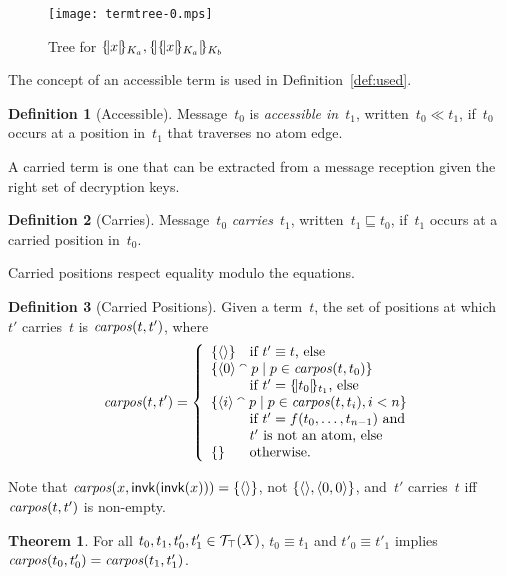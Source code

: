 \documentclass[12pt]{article}
\theoremstyle{definition}
\newtheorem{defn}{Definition}[section]
\newtheorem{thm}{Theorem}[section]
\begin{document}
\begin{figure}
\begin{center}
\texttt{[image: termtree-0.mps]}
\end{center}
\vspace{-2ex}
\caption{Tree for $\{\!|x|\!\}_{K_a},\{\!|\{\!|x|\!\}_{K_a}|\!\}_{K_b}$}\label{fig:term tree}
\end{figure}

The concept of an accessible term is used in Definition~\ref{def:used}.

\begin{defn}[Accessible]\label{def:accessible}
Message~$t_0$ is \emph{accessible in}~$t_1$, written~$t_0\ll t_1$,
if~$t_0$ occurs at a position in~$t_1$ that traverses no atom edge.
\end{defn}

A carried term is one that can be extracted from a message reception
given the right set of decryption keys.

\begin{defn}[Carries]\label{def:carries}
Message~$t_0$ \emph{carries}~$t_1$, written~$t_1\sqsubseteq t_0$,
if~$t_1$ occurs at a carried position in~$t_0$.
\end{defn}

Carried positions respect equality modulo the equations.

\begin{defn}[Carried Positions]
\label{def:carried positions}
Given a term~$t$, the set of positions at which~$t'$ carries~$t$ is
$\operatorname{\mathit{carpos}}(t,t')$, where
$$\fn{carpos}(t,t')=\left\{
\begin{array}{ll}
\{\seq{}\}&\mbox{if $t'\equiv t$, else}\\
\multicolumn{2}{l}{\{\seq{0}\append p \mid
p\in\fn{carpos}(t,t_0)\}}\\
& \mbox{if $t'=\enc{t_0}{t_1}$, else}\\
\multicolumn{2}{l}{\{\seq{i}\append p \mid
p\in\fn{carpos}(t,t_i),i<n\}} \\
& \mbox{if $t'=f(t_0,\ldots,t_{n-1})$ and}\\
&\mbox{$t'$ is not an atom, else}\\
\{\}&\mbox{otherwise.}
\end{array}\right.$$
\end{defn}
Note that $\operatorname{\mathit{carpos}}(x,\operatorname{\mathsf{invk}}(\operatorname{\mathsf{invk}}(x)))=\{\langle\rangle\}$, not
$\{\langle\rangle, \langle0,0\rangle\}$, and~$t'$ carries~$t$ iff $\operatorname{\mathit{carpos}}(t,t')$
is non-empty.

\begin{thm}\label{thm:carpos}
For all $t_0,t_1,t'_0,t'_1\in\mathcal{T}_\top(X)$, $t_0\equiv t_1$ and
$t'_0\equiv t'_1$ implies $\operatorname{\mathit{carpos}}(t_0,t'_0)=
\operatorname{\mathit{carpos}}(t_1,t'_1)$.
\end{thm}
\end{document}

